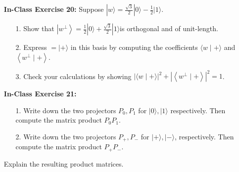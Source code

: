 \documentclass[main.tex]{subfiles}
\begin{document}
\begin{enumerate}
\item[] \textbf{In-Class Exercise 20:} Suppose $|w\rangle=\frac{\sqrt{3}}{2}|0\rangle-\frac{1}{2}|1\rangle$.

    \begin{enumerate}
    \item[1.] Show that $\left|w^{\perp}\right\rangle=\frac{1}{2}|0\rangle+\frac{\sqrt{3}}{2}|1\rangle$is orthogonal and of unit-length.
    \item[2.] Express $=|+\rangle$ in this basis by computing the coefficients $\langle w \mid+\rangle$ and $\left\langle w^{\perp} \mid+\right\rangle$.
    \item[3.] Check your calculations by showing $|\langle w \mid+\rangle|^{2}+\left|\left\langle w^{\perp} \mid+\right\rangle\right|^{2}=1$.
    \end{enumerate}

\item[] \textbf{In-Class Exercise 21:}

    \begin{enumerate}
    \item[1.] Write down the two projectors $P_{0}, P_{1}$ for $|0\rangle,|1\rangle$ respectively. Then compute the matrix product $P_{0} P_{1}$.
    \item[2.] Write down the two projectors $P_{+}, P_{-}$ for $|+\rangle,|-\rangle$, respectively. Then compute the matrix product $P_{+} P_{-}$.
    \end{enumerate}
    
    Explain the resulting product matrices.

\end{enumerate}
\end{document}
